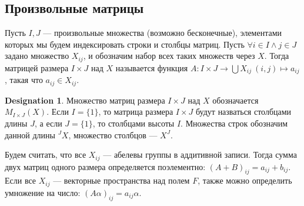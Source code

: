 \documentclass[11pt]{book}
\theoremstyle{definition}
\theoremstyle{plain}
\theoremstyle{plain}
\theoremstyle{definition}
\newtheorem*{name}{Designation}
\theoremstyle{remark}
\begin{document}
\subsection{Произвольные матрицы}
Пусть  $ I, J$ --- произвольные множества (возможно бесконечные), элементами которых мы будем индексировать строки и столбцы матриц. Пусть  $ \forall i \in I \wedge j \in J$ задано множество $ X_{ij}$, и обозначим набор всех таких множеств через $ X$.
Тогда {\sf матрицей размера $ I \times J$ над $ X$}  называется функция  $ A: I \times J \to \bigcup X_{ij} ~ (i, j) \mapsto a_{ij}$, такая что $ a_{ij} \in X_{ij}$.
\begin{name}
    Множество матриц размера $ I \times J$ над $ X$ обозначается  $ M_{I \times J}(X)$.
    Если $ I = \{1\}$, то матрица размера $ I \times J$ будут назваться столбцами длины $ J$, а если  $ J = \{1\}$, то столбцами высоты $ I$. Множества строк обозначим данной длины $ ^J\!X$, множество столбцов --- $ X^{J}$.
\end{name}
Будем считать, что все $ X_{ij}$ --- абелевы группы в аддитивной записи. Тогда сумма двух матриц одного размера определяется поэлементно: $ (A+B)_{ij} = a_{ij}+b_{ij}$.
Если все $ X_{ij}$ --- векторные пространства над полем $ F$, также можно определить умножение на число:  $ (A\alpha)_{ij} = a_{ij}\alpha$.
\end{document}
